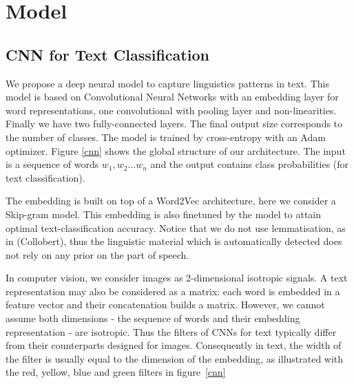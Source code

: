 \section{Model}
\label{sec:model}

\subsection{CNN for Text Classification}

We propose a deep neural model to capture linguistics patterns in text. 
This model is based on Convolutional Neural Networks with an embedding layer for word representations, one convolutional with pooling layer and non-linearities. Finally we have two fully-connected layers. The final output size corresponds to the number of classes. The model is trained by cross-entropy with an Adam optimizer. 
Figure \ref{cnn} shows the global structure of our architecture. The input is a sequence of words $ w_{1}, w_{2} ... w_{n} $ and the output contains class probabilities (for text classification). 

The embedding is built on top of a Word2Vec architecture, here we consider a Skip-gram model. This embedding is also finetuned by the model to attain optimal text-classification accuracy. 
Notice that we do not use lemmatisation, as in (Collobert), thus the linguistic material which is automatically detected does not rely on any prior on the part of speech.

In computer vision, we consider images as 2-dimensional isotropic signals. 
A text representation may also be considered as a matrix: each word is embedded in a feature vector and their concatenation builds a matrix. 
However, we cannot assume both dimensions - the sequence of words and their embedding representation - are isotropic. Thus the filters of CNNs 
for text typically differ from their counterparts designed for images.
Consequently in text, the width of the filter is usually equal to the dimension 
of the embedding, as illustrated with the red, yellow, blue and green filters in figure~\ref{cnn}

